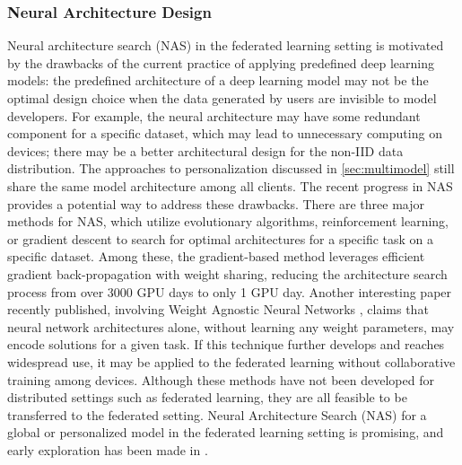 \subsubsection{Neural Architecture Design}
Neural architecture search (NAS) in the federated learning setting is motivated by the drawbacks of the current practice of applying predefined deep learning models: the predefined architecture of a deep learning model may not be the optimal design choice when the data generated by users are invisible to model developers. For example, the neural architecture may have some redundant component for a specific dataset, which may lead to unnecessary computing on devices; there may be a better architectural design for the non-IID data distribution. The approaches to personalization discussed in \cref{sec:multimodel} still share the same model architecture among all clients.
The recent progress in NAS \cite{MiLeNAS2020,real2017large,elsken2018efficient,real2019regularized,Bello2016Neural,pham2018efficient,liu2018darts,xie2018snas,elsken2018efficient,luo2018neural} provides a potential way to address these drawbacks. There are three major methods for NAS, which utilize evolutionary algorithms, reinforcement learning, or gradient descent to search for optimal architectures for a specific task on a specific dataset. Among these, the gradient-based method leverages efficient gradient back-propagation with weight sharing, reducing the architecture search process from over 3000 GPU days to only 1 GPU day. 
Another interesting paper recently published, involving Weight Agnostic Neural Networks \cite{gaier2019weight}, claims that neural network architectures alone, without learning any weight parameters, may encode solutions for a given task. If this technique further develops and reaches widespread use, it may be applied to the federated learning without collaborative training among devices.
Although these methods have not been developed for distributed settings such as federated learning, they are all feasible to be transferred to the federated setting. Neural Architecture Search (NAS) for a global or personalized model in the federated learning setting is promising, and early exploration has been made in \citep{he2020fednas}.

